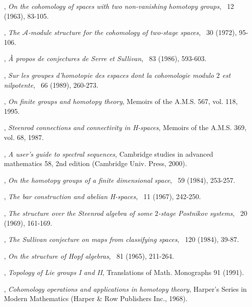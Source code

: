 \begin{thebibliography}{99}
, \textit{On the cohomology of spaces with two non-vanishing homotopy groups}, \MATHSone\ 12 (1963), 83-105.

, \textit{The $\mathcal{A}$-module structure for the cohomology of two-stage spaces}, \MATHSone\ 30 (1972), 95-106.

, \textit{\`A propos de conjectures de Serre et Sullivan}, \INVEM\ 83 (1986), 593-603.

, \textit{Sur les groupes d'homotopie des espaces dont la cohomologie modulo $2$ est nilpotente}, \ISRJM\ 66 (1989), 260-273.

, \textit{On finite groups and homotopy theory}, Memoirs of the A.M.S. 567, vol. 118, 1995.

, \textit{Steenrod connections and connectivity in H-spaces}, Memoirs of the A.M.S. 369, vol. 68, 1987.

, \textit{A user's guide to spectral sequences}, Cambridge studies in advanced mathematics 58, 2nd edition (Cambridge Univ. Press, 2000).

, \textit{On the homotopy groups of a finite dimensional space}, \COMMH\ 59 (1984), 253-257.

, \textit{The bar construction and abelian H-spaces}, \ILLJM\ 11 (1967), 242-250.

, \textit{The structure over the Steenrod algebra of some $2$-stage Postnikov systems}, \QUAJMthree\ 20 (1969), 161-169.

, \textit{The Sullivan conjecture on maps from classifying spaces}, \ANNMAone\ 120 (1984), 39-87.

, \textit{On the structure of Hopf algebras}, \ANNMAone\ 81 (1965), 211-264.

, \textit{Topology of Lie groups I and II}, Translations of Math. Monographs 91 (1991).

, \textit{Cohomology operations and applications in homotopy theory}, Harper's Series in Modern Mathematics (Harper \& Row Publishers Inc., 1968).


\end{thebibliography}
